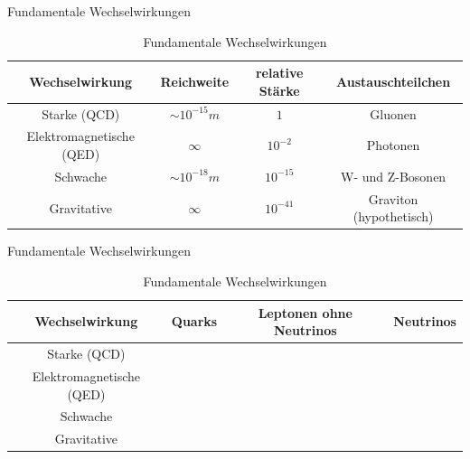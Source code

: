 \documentclass[aspectratio=169,xcolor=dvipsnames]{beamer}
\begin{document}
\begin{frame}{Fundamentale Wechselwirkungen}
    \begin{table}
        \centering
        \begin{tabular}{c|c|c|c}
            \bf Wechselwirkung       & \bf Reichweite   & \bf relative Stärke & \bf Austauschteilchen   \\ \hline
            Starke (QCD)             & $\sim 10^{-15}m$ & $1$                 & Gluonen                 \\ \hline
            Elektromagnetische (QED) & $\infty$         & $10^{-2}$           & Photonen                \\ \hline
            Schwache                 & $\sim 10^{-18}m$ & $10^{-15}$          & W- und Z-Bosonen        \\ \hline
            Gravitative              & $\infty$         & $10^{-41}$          & Graviton (hypothetisch)
        \end{tabular}
        \caption{Fundamentale Wechselwirkungen}
        \label{tab:wechselwirkungen}
    \end{table}
\end{frame}

\newcommand{\checkE}{\emoji{check-mark-button}}
\newcommand{\crossE}{\emoji{cross-mark}}
\begin{frame}{Fundamentale Wechselwirkungen}
    \begin{table}
        \centering
        \begin{tabular}{c|c|c|c}
            \bf Wechselwirkung       & \bf Quarks & \bf Leptonen ohne Neutrinos & \bf Neutrinos \\ \hline
            Starke (QCD)             & \checkE    & \crossE                     & \crossE       \\ \hline
            Elektromagnetische (QED) & \checkE    & \checkE                     & \crossE       \\ \hline
            Schwache                 & \checkE    & \checkE                     & \checkE       \\ \hline
            Gravitative              & \checkE    & \checkE                     & \checkE
        \end{tabular}
        \caption{Fundamentale Wechselwirkungen}
        \label{tab:wechselwirkungen2}
    \end{table}
\end{frame}
\end{document}
